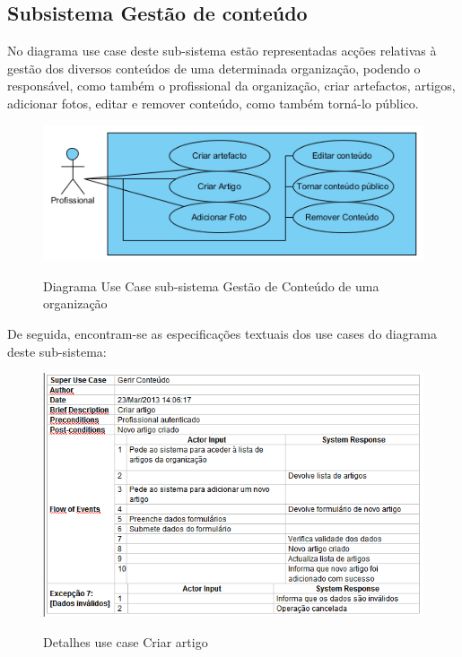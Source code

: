 ﻿\documentclass[12pt,a4paper]{article}
\begin{document}
\clearpage


\subsection{Subsistema Gestão de conteúdo}
No diagrama use case deste sub-sistema estão representadas acções relativas à gestão dos diversos conteúdos de uma determinada organização, podendo o responsável, como também o profissional da organização, criar artefactos, artigos, adicionar fotos, editar e remover conteúdo, como também torná-lo público.\\

\begin{figure}[h!]
\centering
\includegraphics[scale=1]{usecase/P_GerirConteudo}
\label{usecase}
\caption{Diagrama Use Case sub-sistema Gestão de Conteúdo de uma organização}
\end{figure}

De seguida, encontram-se as especificações textuais dos use cases do diagrama deste sub-sistema:\\

\begin{figure}[h!]
\centering
\includegraphics[scale=0.7]{d_usecase/criarartigo}
\label{usecase}
\caption{Detalhes use case Criar artigo}
\end{figure}
\end{document}
